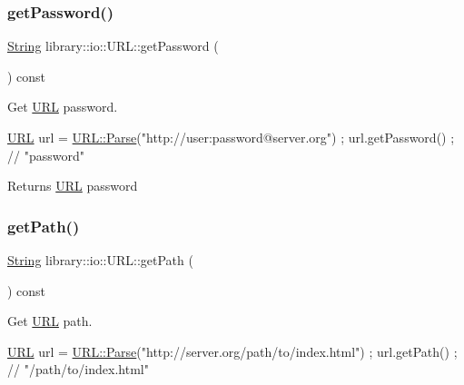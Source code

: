 \subsubsection{\texorpdfstring{get\+Password()}{getPassword()}}
{\footnotesize\ttfamily \hyperlink{namespacelibrary_1_1io_a7469b45835a4421045db344d6a5a1f85}{String} library\+::io\+::\+U\+R\+L\+::get\+Password (\begin{DoxyParamCaption}{ }\end{DoxyParamCaption}) const}



Get \hyperlink{classlibrary_1_1io_1_1_u_r_l}{U\+RL} password. 


\begin{DoxyCode}
\hyperlink{classlibrary_1_1io_1_1_u_r_l_a7e9c070138a6dbd000ffb10b7cd8a5c4}{URL} url = \hyperlink{classlibrary_1_1io_1_1_u_r_l_a98cf42141cf75e1dd5362eb208a1e2bd}{URL::Parse}(\textcolor{stringliteral}{"http://user:password@server.org"}) ;
url.getPassword() ; \textcolor{comment}{// "password"}
\end{DoxyCode}


\begin{DoxyReturn}{Returns}
\hyperlink{classlibrary_1_1io_1_1_u_r_l}{U\+RL} password 
\end{DoxyReturn}
\mbox{\label{classlibrary_1_1io_1_1_u_r_l_ae5c4c8332a16e048fef051ab1c70c980}} 
\subsubsection{\texorpdfstring{get\+Path()}{getPath()}}
{\footnotesize\ttfamily \hyperlink{namespacelibrary_1_1io_a7469b45835a4421045db344d6a5a1f85}{String} library\+::io\+::\+U\+R\+L\+::get\+Path (\begin{DoxyParamCaption}{ }\end{DoxyParamCaption}) const}



Get \hyperlink{classlibrary_1_1io_1_1_u_r_l}{U\+RL} path. 


\begin{DoxyCode}
\hyperlink{classlibrary_1_1io_1_1_u_r_l_a7e9c070138a6dbd000ffb10b7cd8a5c4}{URL} url = \hyperlink{classlibrary_1_1io_1_1_u_r_l_a98cf42141cf75e1dd5362eb208a1e2bd}{URL::Parse}(\textcolor{stringliteral}{"http://server.org/path/to/index.html"}) ;
url.getPath() ; \textcolor{comment}{// "/path/to/index.html"}
\end{DoxyCode}


